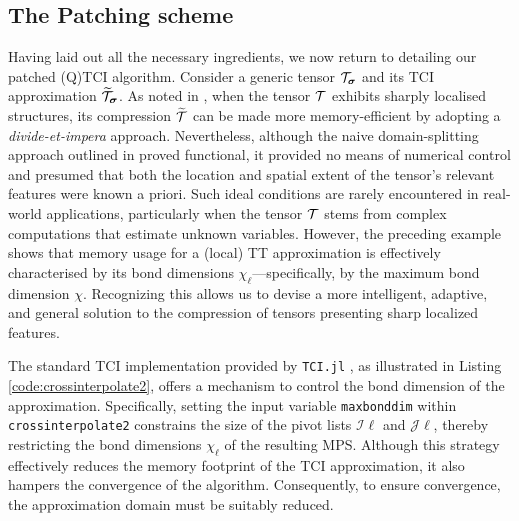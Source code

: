 \subsection{The Patching scheme}
Having laid out all the necessary ingredients, we now return to detailing our patched (Q)TCI algorithm. 
Consider a generic tensor $\mathcal{T}_{\boldsymbol{\sigma}}$ and its TCI approximation $\widetilde{\mathcal{T}}_{\boldsymbol{\sigma}}$. As noted in , when the tensor $\mathcal{T}$ exhibits sharply localised structures, its compression $\widetilde{\mathcal{T}}$ can be made more memory-efficient by adopting a \textit{divide-et-impera} approach. Nevertheless, although the naive domain-splitting approach outlined in  proved functional, it provided no means of numerical control and presumed that both the location and spatial extent of the tensor’s relevant features were known a priori. Such ideal conditions are rarely encountered in real-world applications, particularly when the tensor $\mathcal{T}$ stems from complex computations that estimate unknown variables. However, the preceding example shows that memory usage for a (local) TT approximation is effectively characterised by its bond dimensions $\chi_\ell$—specifically, by the maximum bond dimension $\chi$. Recognizing this allows us to devise a more intelligent, adaptive, and general solution to the compression of tensors presenting sharp localized features.

The standard TCI implementation provided by \texttt{TCI.jl} \cite{TensorCrossInterpolation.jl}, as illustrated in Listing \ref{code:crossinterpolate2}, offers a mechanism to control the bond dimension of the approximation. Specifically, setting the input variable \texttt{maxbonddim} within \texttt{crossinterpolate2} constrains the size of the pivot lists $\mathcal{I}\ell$ and $\mathcal{J}\ell$, thereby restricting the bond dimensions $\chi_\ell$ of the resulting MPS. Although this strategy effectively reduces the memory footprint of the TCI approximation, it also hampers the convergence of the algorithm. Consequently, to ensure convergence, the approximation domain must be suitably reduced. 


